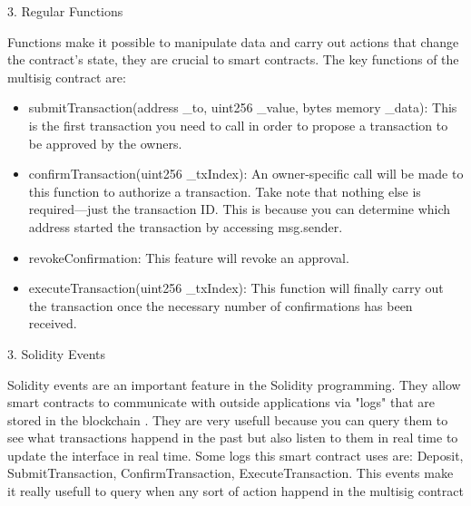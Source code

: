 \par 3. Regular Functions
\par Functions make it possible to manipulate data and carry out actions that change the contract's state, they are crucial to smart contracts. The key functions of the multisig contract are:
 \begin{itemize}
	\item submitTransaction(address \_to, uint256 \_value, bytes memory \_data): This is the first transaction you need to call in order to propose a transaction to be approved by the owners.
	\item confirmTransaction(uint256 \_txIndex):  An owner-specific call will be made to this function to authorize a transaction. Take note that nothing else is required—just the transaction ID. This is because you can determine which address started the transaction by accessing msg.sender.
	\item revokeConfirmation: This feature will revoke an approval.
	\item executeTransaction(uint256 \_txIndex): This function will finally carry out the transaction once the necessary number of confirmations has been received.
\end{itemize}
\par 3. Solidity Events
\par Solidity events are an important feature in the Solidity programming. They allow smart contracts to communicate with outside applications via "logs" that are stored in the blockchain \cite{soliditylogs}. They are very usefull because you can query them to see what transactions happend in the past but also listen to them in real time to update the interface in real time. Some logs this smart contract uses are: Deposit, SubmitTransaction, ConfirmTransaction, ExecuteTransaction. This events make it really usefull to query when any sort of action happend in the multisig contract

